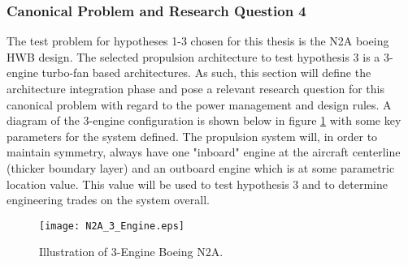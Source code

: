 		\subsubsection{Canonical Problem and Research Question 4}
			The test problem for hypotheses 1-3 chosen for this thesis is the N2A boeing HWB design.  The selected propulsion architecture to test hypothesis 3 is a 3-engine turbo-fan based architectures.  As such, this section will define the architecture integration phase and pose a relevant research question for this canonical problem with regard to the power management and design rules.  A diagram of the 3-engine configuration is shown below in figure \ref{N2A_3_Engine} with some key parameters for the system defined.  The propulsion system will, in order to maintain symmetry, always have one "inboard" engine at the aircraft centerline (thicker boundary layer) and an outboard engine which is at some parametric location value.  This value will be used to test hypothesis 3 and to determine engineering trades on the system overall.		
			
			\begin{figure}[htp]		
				\centering		
				\texttt{[image: N2A\_3\_Engine.eps]}
				\caption{Illustration of 3-Engine Boeing N2A.}
				\label{N2A_3_Engine}
			\end{figure}		
			\vspace{-10mm}
